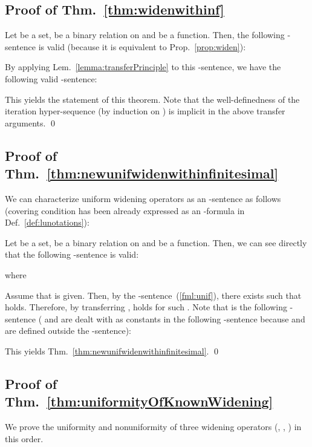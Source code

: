 \documentclass[envcountsect,orivec]{llncs} \pdfoutput=1
\theoremstyle{definition}
\def\myqed{\qed}
\begin{document}
\subsection{Proof of Thm.~\ref{thm:widenwithinf}}
\begin{myproof}
 Let  be a set,  be a binary relation on  and  be a function.
 Then, the following -sentence is valid (because it is equivalent to Prop.~\ref{prop:widen}):
 
By applying Lem.~\ref{lemma:transferPrinciple} to this -sentence, we have the following valid -sentence:
 
This yields the statement of this theorem.
Note that the well-definedness of the iteration hyper-sequence (by
 induction on ) is implicit in the above transfer arguments.
\myqed
\end{myproof}

\subsection{Proof of Thm.~\ref{thm:newunifwidenwithinfinitesimal}}

\begin{myproof}
We can characterize uniform widening operators as an -sentence as follows (covering condition has been already expressed as an -formula in Def.~\ref{def:lunotations}):

 Let  be a set,  be a binary relation on  and  be a function.
 Then, we can see directly that the following -sentence is valid:
  
where


Assume that  is given. Then, by the -sentence~(\ref{fml:unif}), there exists  such that  holds.
Therefore, by transferring ,  holds for such .
Note that
 is the following -sentence ( and  are dealt with as constants in the following -sentence because  and  are defined outside the -sentence):
 
This yields Thm.~\ref{thm:newunifwidenwithinfinitesimal}.
\myqed
\end{myproof}

\subsection{Proof of Thm.~\ref{thm:uniformityOfKnownWidening}}
We prove the uniformity and nonuniformity of three widening operators (, , ) in this order.
\end{document}
